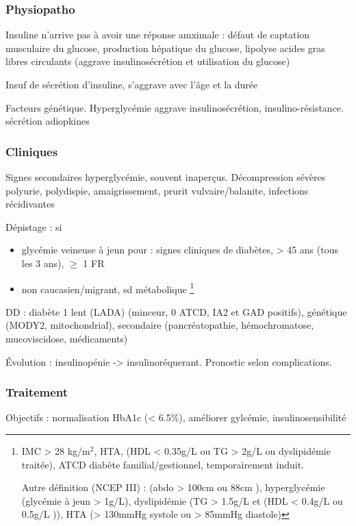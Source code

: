 \documentclass[11pt]{article}
\begin{document}
\subsubsection{Physiopatho}
\label{sec:orgb814149}
Insuline n'arrive pas à avoir une réponse amximale : défaut de captation
musculaire du glucose, \inc production hépatique du glucose, lipolyse \inc acides gras
libres circulants \thus (aggrave \dec insulinosécrétion et utilisation du glucose)

Insuf de sécrétion d'insuline, s'aggrave avec l'âge et la durée

Facteurs génétique. Hyperglycémie aggrave insulinosécrétion,
insulino-résistance. \dec sécrétion adiopkines

\subsubsection{Cliniques}
\label{sec:org97bcf2c}
Signes secondaires hyperglycémie, souvent inaperçus. Décompression sévères \thus
polyurie, polydispie, amaigrissement, prurit vulvaire/balanite, infections
récidivantes

Dépistage : si
\begin{itemize}
\item glycémie veineuse à jeun pour : signes cliniques de diabètes, > 45 ans (tous les 3 ans), \(\ge\) 1 FR
\item non caucasien/migrant, sd métabolique \footnote{IMC > 28 kg/m\(^{\text{2}}\), HTA, (HDL < 0.35g/L ou
TG > 2g/L ou dyslipidémie traitée), ATCD diabète familial/gestionnel,
temporairement induit.

Autre définition (NCEP III) : (\diameter abdo > 100cm \male ou 88cm \female), hyperglycémie
  (glycémie à jeun > 1g/L), dyslipidémie (TG > 1.5g/L et (HDL < 0.4g/L \male ou
  0.5g/L \female)), HTA (> 130mmHg systole ou > 85mmHg diastole)}
\end{itemize}

DD : diabète 1 lent (LADA) (minceur, 0 ATCD, IA2 et GAD positifs), génétique
(MODY2, mitochondrial), secondaire (pancréatopathie, hémochromatose,
mucoviscidose, médicaments)

Évolution : insulinopénie -> insulinoréquerant. Pronostic selon complications.

\subsubsection{Traitement}
\label{sec:orgf37f86d}
Objectifs : normalisation HbA1c (< 6.5\%), améliorer gylcémie, insulinosensibilité
\end{document}
